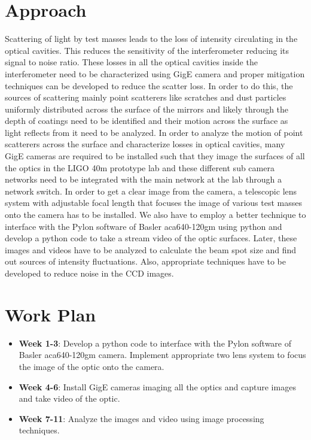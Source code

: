\documentclass[colorlinks=true,pdfstartview=FitV,linkcolor=blue,
            citecolor=red,urlcolor=magenta]{ligodoc}
\begin{document}
\section{Approach}
Scattering of light by test masses leads to the loss of intensity circulating in the optical cavities. This reduces the sensitivity of the interferometer reducing its signal to noise ratio. These losses in all the optical cavities inside the interferometer need to be characterized using GigE camera and proper mitigation techniques can be developed to reduce the scatter loss. In order to do this, the sources of scattering mainly point scatterers like scratches and dust particles uniformly distributed across the surface of the mirrors and likely through the depth of coatings need to be identified and their motion across the surface as light reflects from it need to be analyzed. In order to analyze the motion of point scatterers across the surface and characterize losses in optical cavities, many GigE cameras are required to be installed such that they image the surfaces of all the optics in the LIGO 40m prototype lab and these  different sub camera networks need to be integrated with the main network at the lab through a network switch. In order to get a clear image from the camera, a telescopic lens system with adjustable focal length that focuses the image of various test masses onto the camera has to be installed. We also have to employ a better technique to interface with the Pylon software of Basler aca640-120gm using python and develop a python code to take a stream video of the optic surfaces. Later, these images and videos have to be analyzed to calculate the beam spot size and find out sources of intensity fluctuations. Also, appropriate techniques have to be developed to reduce noise in the CCD images.

\section{Work Plan}
\begin{itemize}
    \item \textbf{Week 1-3}: Develop a python code to interface with the Pylon software of Basler aca640-120gm camera. Implement appropriate two lens system to focus the image of the optic onto the camera.
    \item \textbf{Week 4-6}: Install GigE cameras imaging all the optics and capture images and take video of the optic.
    \item \textbf{Week 7-11}: Analyze the images and video using image processing techniques.
\end{itemize}
       
\end{document}
